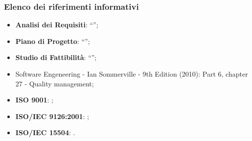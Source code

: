 		\subsubsection{Elenco dei riferimenti informativi}
			\begin{itemize}
				\item \textbf{Analisi dei Requisiti}: “”;
				\item \textbf{Piano di Progetto}: “”;
				\item \textbf{Studio di Fattibilità}: “”;
				\item Software Engeneering - Ian Sommerville - 9th Edition (2010): Part 6, chapter 27 - Quality management;
				\item \textbf{ISO 9001}: ;
				\item \textbf{ISO/IEC 9126:2001}: ;
				\item \textbf{ISO/IEC 15504}: .
			\end{itemize}
